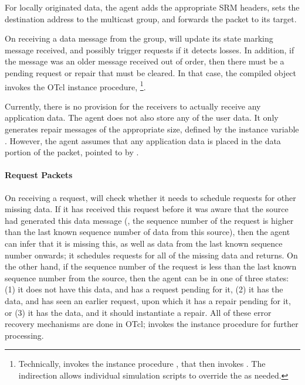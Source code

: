 {For locally originated data, 
the agent adds the appropriate SRM headers,
sets the destination address to the multicast group, 
and forwards the packet to its target.

On receiving a data message from the group,
will update its state marking message  received,
and possibly trigger requests if it detects losses.
In addition, if the message was an older message received out of order,
then there must be a pending request or repair that must be cleared.
In that case, the compiled object invokes the OTcl instance procedure,
%
\footnote{Technically,
   invokes the instance procedure
  ,
  that then invokes .
  The indirection allows individual simulation scripts to override the
   as needed.}.

Currently, there is no provision for the receivers
to actually receive any application data.
The agent does not also store any of the user data.
It only generates repair messages of the appropriate size,
defined by the instance variable .
However, the agent assumes that any application data
is placed in the data portion of the packet,
pointed to by .

\paragraph{Request Packets}
On receiving a request, 
will check whether it needs to schedule requests for other missing data.
If it has received this request
before it was aware that the source had generated this data message
(\ie, the sequence number of the request is higher than 
the last known sequence number of data from this source),
then the agent can infer that it is missing this, as well as data
from the last known sequence number onwards;
it schedules requests for all of the missing data and returns.
On the other hand, if the sequence number of the request is less
than the last known sequence number from the source,
then the agent can be in one of three states:
(1) it does not have this data, and has a request pending for it,
(2) it has the data, and has seen an earlier request,
    upon which it has a repair pending for it, or
(3) it has the data, and it should instantiate a repair.
All of these error recovery mechanisms are done in OTcl;
 invokes the instance procedure
for further processing.

}
